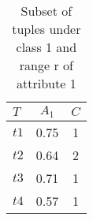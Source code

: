 \begin{table}[h]
\caption{Subset of tuples under class 1 and range r of attribute 1}
\label{table:table2_3}
\centering
\begin{tabular}{lcc}
	\toprule
	\textbf{$\mathit{T}$} & \textbf{$\mathit{A_1}$}   & \textbf{$\mathit{C}$} \\
	\midrule
	$\mathit{t1}$ & 0.75 & 1 \\
	$\mathit{t2}$ & 0.64 & 2 \\
	$\mathit{t3}$ & 0.71 & 1 \\
	$\mathit{t4}$ & 0.57 & 1 \\
	\bottomrule
\end{tabular} 
\end{table}
